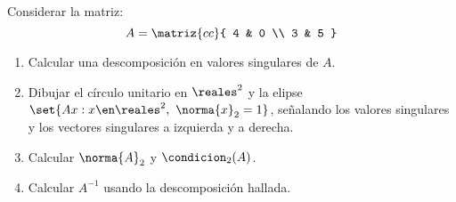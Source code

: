 \begin{enunciado}{\ejercicio}
  Considerar la matriz:
  $$
    A = \matriz{cc}{
      4 & 0 \\
      3 & 5
    }
  $$
  \begin{enumerate}[label=(\alph*)]
    \item Calcular una descomposición en valores singulares de $A$.
    \item Dibujar el círculo unitario en $\reales^2$ y la elipse $\set{Ax : x \en \reales^2,\ \norma{x}_2 = 1}$,
          señalando los valores singulares y los vectores singulares a izquierda y a derecha.

    \item Calcular $\norma{A}_2$ y $\condicion_2(A)$.

    \item Calcular $A^{-1}$ usando la descomposición hallada.
  \end{enumerate}
\end{enunciado}

